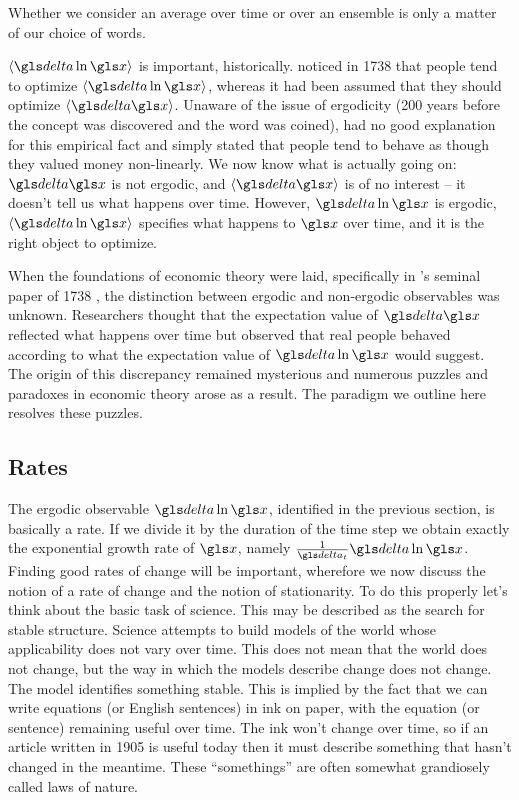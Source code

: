 Whether we consider  an average over 
time or over an ensemble is only a matter of our choice of words. 

$\ave{\d \ln \x}$ is important, historically.  noticed in 
1738 \cite{Bernoulli1738} that people tend to
optimize $\ave{\d \ln \x}$, whereas it had been assumed that they should optimize $\ave{\d \x}$. 
Unaware of the issue of ergodicity (200 years before the concept was discovered 
and the word was coined),  had no good explanation for this 
empirical fact and simply stated that people tend to behave as though they valued
money non-linearly. We now know what is actually going on: $\d \x$ is not ergodic, 
and $\ave{\d \x}$ is of no interest -- it doesn't tell us what happens over time. However,
$\d \ln \x$ is ergodic, $\ave{\d \ln \x}$ specifies what happens to $\x$ over time, and it
is the right object to optimize. 

When the foundations of economic theory were laid, specifically in 's 
seminal paper of 1738 \cite{Bernoulli1738}, the distinction between ergodic and
non-ergodic observables was unknown. Researchers thought that the expectation value
of $\d \x$ reflected what happens over time but observed that real people behaved
according to what the expectation value of $\d \ln \x$ would suggest. The origin of this 
discrepancy remained mysterious and numerous puzzles and paradoxes in 
economic theory arose as a result. The paradigm we outline here resolves these puzzles.


\subsection{Rates}
The ergodic observable $\d \ln \x$, identified in the previous section, is basically a rate.
If we divide it by the duration of the time step we obtain exactly the exponential 
growth rate of $\x$, namely $\frac{1}{\dt}\d \ln \x$. Finding good rates of change 
will be important, wherefore we now discuss the notion of a rate of change and 
the notion of stationarity. 
To do this properly let's think about the basic task of science. This may be described as the 
search for stable structure. Science attempts to build models of the world 
whose applicability does not vary over time. This does not mean that the world does not change, 
but the way in which the models describe change does not change. The model identifies
something stable. This is implied by the fact that we can write 
equations (or English sentences) in ink on paper, with the equation (or sentence) remaining 
useful over time. The ink won't change over time, so
if an article written in 1905 is useful today then it must describe something that hasn't 
changed in the meantime. These ``somethings'' are often somewhat 
grandiosely called laws of nature.

